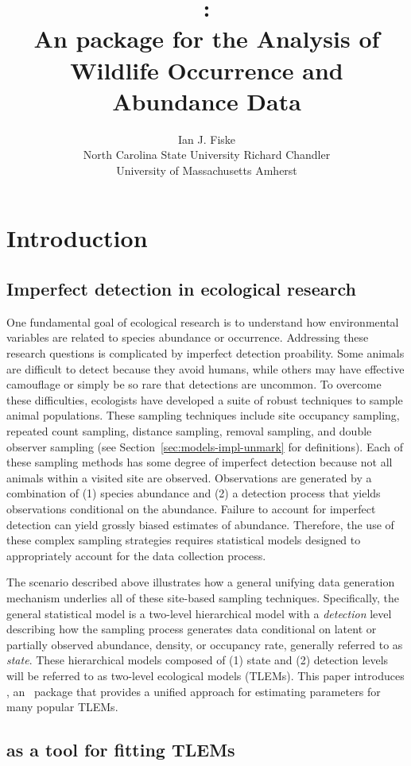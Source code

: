 \documentclass[article,shortnames]{jss}
\author{Ian J. Fiske\\North Carolina State University \And
  Richard Chandler\\ University of Massachusetts Amherst}
\title{\pkg{unmarked}:\\
  An \proglang{R} package for the Analysis of Wildlife Occurrence and Abundance Data}
\newcommand{\um}{\pkg{unmarked}}
\newcommand{\rlang}{\proglang{R}}
\begin{document}
\section{Introduction}


\subsection{Imperfect detection in ecological research}

One fundamental goal of ecological research is to understand how
environmental variables are related to species abundance or
occurrence.  Addressing these research questions is 
complicated by imperfect detection proability. 
Some animals are difficult to detect because they avoid humans, while others
may have effective camouflage
or simply be so rare that detections are uncommon.  To overcome these
difficulties, ecologists have developed a suite of robust techniques to
sample animal populations.  These sampling techniques include site occupancy 
sampling, repeated count sampling, distance sampling, 
removal sampling, and double observer sampling 
(see Section~\ref{sec:models-impl-unmark} for definitions).  Each of these
sampling methods has some degree of imperfect detection because not
all animals within a visited site are observed.  Observations are
generated by a combination of (1) species abundance and (2) a
detection process that yields observations conditional on the
abundance.  Failure to account for imperfect detection can yield
grossly biased estimates of abundance.  Therefore, the use of these
complex sampling strategies requires statistical models 
designed to appropriately account for the data collection process.

The scenario described above illustrates how a general unifying data
generation mechanism underlies all of these site-based sampling
techniques.  Specifically, the general statistical model is a
two-level hierarchical model with a \emph{detection} level describing
how the sampling process generates data conditional on latent or
partially observed abundance, density, or occupancy rate, generally
referred to as \emph{state}.  These hierarchical models composed of
(1) state and (2) detection levels will be referred to as two-level
ecological models (TLEMs).  This paper introduces 
\um, an \rlang\ package that provides a unified approach for estimating parameters
for many popular TLEMs.

\subsection[unmarked as a tool for fitting TLEMs]{ as a tool for fitting TLEMs} 
\end{document}
